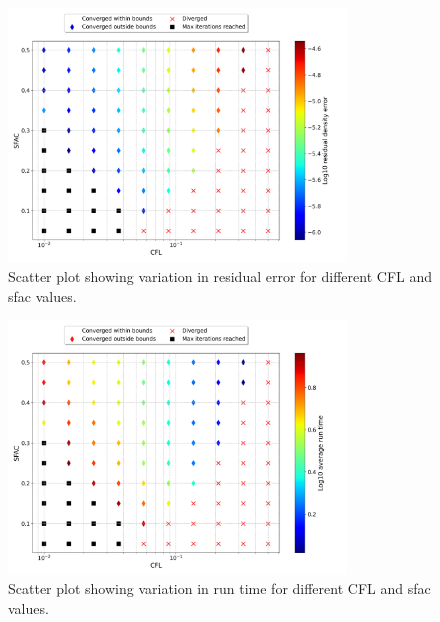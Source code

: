 \documentclass{article}
\begin{document}
\begin{figure}[H]
    \centering
    \includegraphics[width=0.8\textwidth]{figures/bump_cfl_sfac_residual.png}
    \caption{Scatter plot showing variation in residual error for different CFL and sfac values.}
    \label{fig:bump_cfl_sfac_residual}
\end{figure}

\begin{figure}[H]
    \centering
    \centering
    \includegraphics[width=0.8\textwidth]{figures/bump_cfl_sfac_time.png}
    \caption{Scatter plot showing variation in run time for different CFL and sfac values.}
    \label{fig:bump_cfl_sfac_time}
\end{figure}
\end{document}
